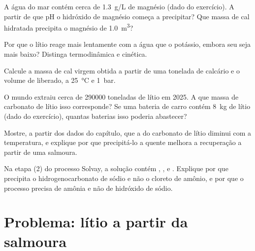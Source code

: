 \begin{exercise}[$\star\star$]\label{exo:b1:s-block:7}
A água do mar contém cerca de \qty{1.3}{g/L} de magnésio (dado do
exercício). A partir de que pH o hidróxido de magnésio começa a
precipitar? Que massa de cal hidratada precipita o magnésio de \qty{1.0}{m^3}?
\end{exercise}

\begin{exercise}[$\star\star$]\label{exo:b1:s-block:8}
Por que o lítio reage mais lentamente com a água que o potássio, embora
seu  seja mais baixo? Distinga termodinâmica e cinética.
\end{exercise}

\begin{exercise}[$\star\star$]\label{exo:b1:s-block:9}
Calcule a massa de cal virgem obtida a partir de uma tonelada de calcário
e o volume de  liberado, a \qty{25}{\celsius} e \qty{1}{bar}.
\end{exercise}

\begin{exercise}[$\star\star\star$]\label{exo:b1:s-block:10}
O mundo extraiu cerca de \num{290000} toneladas de lítio em 2025. A que
massa de carbonato de lítio isso corresponde? Se uma bateria de carro
contém \qty{8}{kg} de lítio (dado do exercício), quantas baterias isso
poderia abastecer?
\end{exercise}

\begin{exercise}[$\star\star\star$]\label{exo:b1:s-block:11}
Mostre, a partir dos dados do capítulo, que a  do carbonato de
lítio diminui com a temperatura, e explique por que precipitá-lo a quente
melhora a recuperação a partir de uma salmoura.
\end{exercise}

\begin{exercise}[$\star\star\star$]\label{exo:b1:s-block:12}
Na etapa (2) do processo Solvay, a solução contém ,
,  e . Explique por que precipita o
hidrogenocarbonato de sódio e não o cloreto de amônio, e por que o
processo precisa de amônia e não de hidróxido de sódio.
\end{exercise}

\section{Problema: lítio a partir da salmoura}

